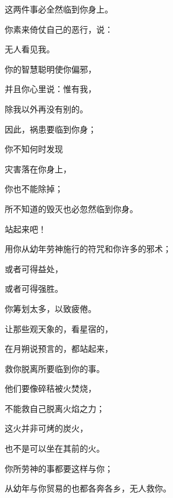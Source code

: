 {\par }{\Q 这两件事必全然临到你身上。
\par }{\BB \par }{\Q {}你素来倚仗自己的恶行，说：
\par }{\Q 无人看见我。
\par }{\Q 你的智慧聪明使你偏邪，
\par }{\Q 并且你心里说：惟有我，
\par }{\Q 除我以外再没有别的。
\par }{\Q {}因此，祸患要临到你身；
\par }{\Q 你不知何时发现
\par }{\Q 灾害落在你身上，
\par }{\Q 你也不能除掉；
\par }{\Q 所不知道的毁灭也必忽然临到你身。
\par }{\BB \par }{\Q {}站起来吧！
\par }{\Q 用你从幼年劳神施行的符咒和你许多的邪术；
\par }{\Q 或者可得益处，
\par }{\Q 或者可得强胜。
\par }{\Q {}你筹划太多，以致疲倦。
\par }{\Q 让那些观天象的，看星宿的，
\par }{\Q 在月朔说预言的，都站起来，
\par }{\Q 救你脱离所要临到你的事。
\par }{\BB \par }{\Q {}他们要像碎秸被火焚烧，
\par }{\Q 不能救自己脱离火焰之力；
\par }{\Q 这火并非可烤的炭火，
\par }{\Q 也不是可以坐在其前的火。
\par }{\Q {}你所劳神的事都要这样与你{}；
\par }{\Q 从幼年与你贸易的也都各奔各乡，无人救你。

}
